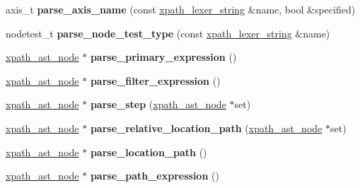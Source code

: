 \begin{DoxyCompactItemize}
\item 
\hypertarget{structxpath__parser_ad67ec26e0e286ca1bb5144a79e3a3583}{axis\-\_\-t {\bfseries parse\-\_\-axis\-\_\-name} (const \hyperlink{structxpath__lexer__string}{xpath\-\_\-lexer\-\_\-string} \&name, bool \&specified)}\label{structxpath__parser_ad67ec26e0e286ca1bb5144a79e3a3583}

\item 
\hypertarget{structxpath__parser_a7b4555d7bfdb90971333c46963d5d791}{nodetest\-\_\-t {\bfseries parse\-\_\-node\-\_\-test\-\_\-type} (const \hyperlink{structxpath__lexer__string}{xpath\-\_\-lexer\-\_\-string} \&name)}\label{structxpath__parser_a7b4555d7bfdb90971333c46963d5d791}

\item 
\hypertarget{structxpath__parser_a320728b83e426c4874066d633ffe65d9}{\hyperlink{classxpath__ast__node}{xpath\-\_\-ast\-\_\-node} $\ast$ {\bfseries parse\-\_\-primary\-\_\-expression} ()}\label{structxpath__parser_a320728b83e426c4874066d633ffe65d9}

\item 
\hypertarget{structxpath__parser_a0530aefc1445c4eac4614e895dd0a219}{\hyperlink{classxpath__ast__node}{xpath\-\_\-ast\-\_\-node} $\ast$ {\bfseries parse\-\_\-filter\-\_\-expression} ()}\label{structxpath__parser_a0530aefc1445c4eac4614e895dd0a219}

\item 
\hypertarget{structxpath__parser_a7daf146822e199d8ad564be25daa49db}{\hyperlink{classxpath__ast__node}{xpath\-\_\-ast\-\_\-node} $\ast$ {\bfseries parse\-\_\-step} (\hyperlink{classxpath__ast__node}{xpath\-\_\-ast\-\_\-node} $\ast$set)}\label{structxpath__parser_a7daf146822e199d8ad564be25daa49db}

\item 
\hypertarget{structxpath__parser_ab50d8b75f78b7e2eb77a1cf6872daa00}{\hyperlink{classxpath__ast__node}{xpath\-\_\-ast\-\_\-node} $\ast$ {\bfseries parse\-\_\-relative\-\_\-location\-\_\-path} (\hyperlink{classxpath__ast__node}{xpath\-\_\-ast\-\_\-node} $\ast$set)}\label{structxpath__parser_ab50d8b75f78b7e2eb77a1cf6872daa00}

\item 
\hypertarget{structxpath__parser_aae61a2931ba0b0c713b5d043f1cef6d4}{\hyperlink{classxpath__ast__node}{xpath\-\_\-ast\-\_\-node} $\ast$ {\bfseries parse\-\_\-location\-\_\-path} ()}\label{structxpath__parser_aae61a2931ba0b0c713b5d043f1cef6d4}

\item 
\hypertarget{structxpath__parser_a024b539aa4ea7226edce0a3d0a577549}{\hyperlink{classxpath__ast__node}{xpath\-\_\-ast\-\_\-node} $\ast$ {\bfseries parse\-\_\-path\-\_\-expression} ()}\label{structxpath__parser_a024b539aa4ea7226edce0a3d0a577549}


\end{DoxyCompactItemize}
